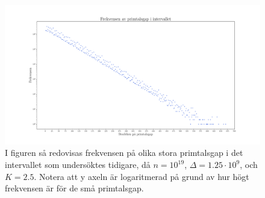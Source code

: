 \begin{figure}[H]
    \centering
    \includegraphics[width = \textwidth]{coen/Images/GapsNoKapps.pdf}
    \caption{I figuren så redovisas frekvensen på olika stora primtalsgap i det intervallet som undersöktes tidigare, då \(n = 10^{19}\), \(\Delta = 1.25\cdot10^{9}\), och \(K = 2.5\). Notera att y axeln är logaritmerad på grund av hur högt frekvensen är för de små primtalsgap.}
    \label{fig:res.gap}
\end{figure}
